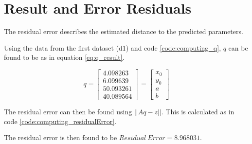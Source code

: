\section{Result and Error Residuals}
The residual error describes the estimated distance to the predicted parameters.



Using the data from the first dataset (d1) and code \ref{code:computing_q}, $q$ can be found to be as in equation \ref{eq:q_result}.



        
        
 

\begin{equation}
q = 
\left[
\begin{array}{c}
4.098263 \\
6.099639 \\
50.093261 \\
40.089564
\end{array}
\right]
= 
\left[
\begin{array}{c}
x_0 \\
y_0 \\
a \\
b
\end{array}
\right]
\label{eq:q_result}
\end{equation}

The residual error can then be found using $|| Aq - z ||$.
This is calculated as in code \ref{code:computing_residualError}.



The residual error is then found to be $Residual\ Error = 8.968031$.
